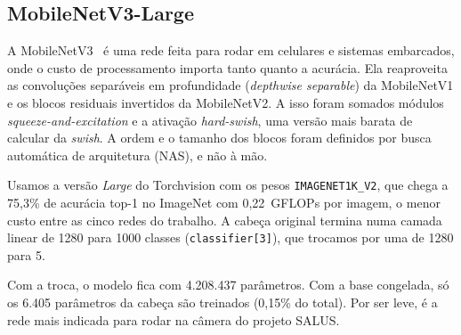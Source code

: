 \subsection{MobileNetV3-Large}

A MobileNetV3~\cite{howard2019mobilenetv3} é uma rede feita para rodar em
celulares e sistemas embarcados, onde o custo de processamento importa tanto
quanto a acurácia. Ela reaproveita as convoluções separáveis em profundidade
(\textit{depthwise separable}) da MobileNetV1 e os blocos residuais invertidos
da MobileNetV2. A isso foram somados módulos \textit{squeeze-and-excitation} e
a ativação \textit{hard-swish}, uma versão mais barata de calcular da
\textit{swish}. A ordem e o tamanho dos blocos foram definidos por busca
automática de arquitetura (NAS), e não à mão.

Usamos a versão \textit{Large} do Torchvision com os pesos
\texttt{IMAGENET1K\_V2}, que chega a 75,3\% de acurácia top-1 no ImageNet com
0,22~GFLOPs por imagem, o menor custo entre as cinco redes do trabalho. A
cabeça original termina numa camada linear de 1280 para 1000 classes
(\texttt{classifier[3]}), que trocamos por uma de 1280 para 5.

Com a troca, o modelo fica com 4.208.437 parâmetros. Com a base congelada, só
os 6.405 parâmetros da cabeça são treinados (0,15\% do total). Por ser leve, é
a rede mais indicada para rodar na câmera do projeto SALUS.
